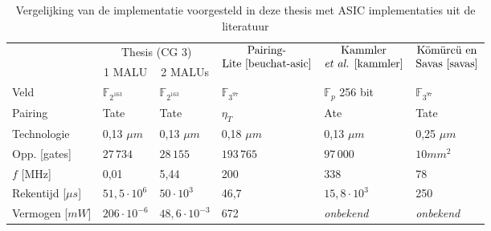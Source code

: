 \begin{table}[h]
	\caption{Vergelijking van de implementatie voorgesteld in deze thesis met ASIC implementaties uit de literatuur}
	\label{tabel-resultaten-asic}

	\begin{narrow}{-2cm}{-2cm}
		\centering
		\begin{tabular}{llllll}
			\toprule
			&	\multicolumn{2}{c}{Thesis (CG 3)\footnotemark[2]}	& \multirow{2}{*}{$\begin{array}{@{}c@{}}\text{Pairing-}\\\text{Lite \cite{beuchat-asic}}\end{array}$}	& \multicolumn{1}{c}{\multirow{2}{*}{$\begin{array}{@{}c@{}}\text{Kammler}\\\text{\emph{et al.} \cite{kammler}}\end{array}$}}	&  \multicolumn{1}{c}{\multirow{2}{*}{$\begin{array}{@{}c@{}}\text{K\"om\"urc\"u en}\\\text{Savas \cite{savas}}\end{array}$}}\\
			\cmidrule(r){2-3}
			& \multicolumn{1}{c}{1 MALU} & \multicolumn{1}{c}{2 MALUs} & & &\\
	 		\midrule
			Veld																				& $\mathbb{F}_{2^{163}}$	& $\mathbb{F}_{2^{163}}$	& $\mathbb{F}_{3^{97}}$	& $\mathbb{F}_{p}$ 256 bit	& $\mathbb{F}_{3^{97}}$ \\
			Pairing																			& Tate							& Tate							& $\eta_T$					& Ate			 					& Tate\\
			Technologie																		& 0,13 $\mu m$					& 0,13 $\mu m$					& 0,18 $\mu m$				& 0,13 $\mu m$					& 0,25 $\mu m$\\
			Opp. [gates]																	& $27\,734$						& $28\,155$						& $193\,765$				& $97\,000$						& \emph{$10 mm^2$}\footnotemark[3]\\
			$f$ [MHz]																		& 0,01							& 5,44							& 200							& 338								& 78\\
			Rekentijd [$\mu s$]															& $51,5 \cdot 10^6$			& $50 \cdot 10^3$				& 46,7						& $15,8 \cdot 10^3$			& 250\footnotemark[4]\\
			Vermogen [$mW$]																& $206 \cdot 10^{-6}$		& $48,6 \cdot 10^{-3}$		& 672							& \emph{onbekend}				& \emph{onbekend}\\
			\bottomrule		
		\end{tabular}
	\end{narrow}
	

\end{table}
